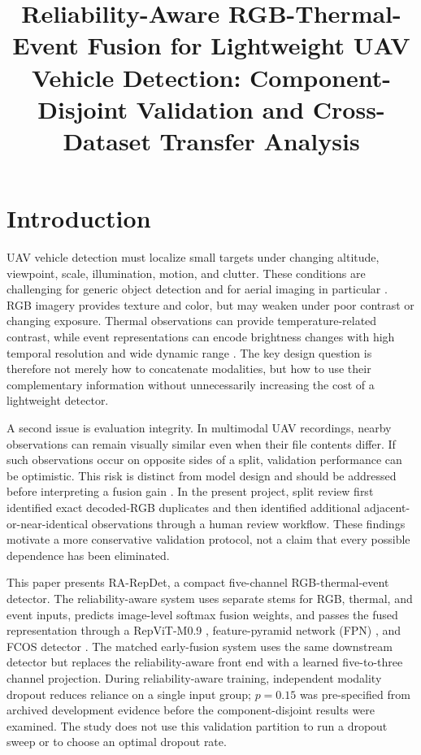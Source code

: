 \documentclass[pdflatex,sn-basic,Numbered,iicol]{sn-jnl}
\title[Reliability-aware RGB-thermal-event fusion]{Reliability-Aware RGB-Thermal-Event Fusion for Lightweight UAV Vehicle Detection: Component-Disjoint Validation and Cross-Dataset Transfer Analysis}
\author[1]{\fnm{Nan} \sur{Xin}}
\author*[1]{\fnm{Xueting} \sur{Jin}}\email{jinxueting@ahpc.edu.cn}
\affil*[1]{\orgname{Anhui Police College}, \orgaddress{\city{Hefei}, \state{Anhui}, \country{China}}}
\begin{document}
\raggedbottom
\maketitle

\section{Introduction}
UAV vehicle detection must localize small targets under changing altitude, viewpoint, scale, illumination, motion, and clutter. These conditions are challenging for generic object detection and for aerial imaging in particular \cite{zhao2019object,cheng2016survey,xia2022dota,zhu2017deepRS}. RGB imagery provides texture and color, but may weaken under poor contrast or changing exposure. Thermal observations can provide temperature-related contrast, while event representations can encode brightness changes with high temporal resolution and wide dynamic range \cite{baltrusaitis2019multimodal,gallego2022event}. The key design question is therefore not merely how to concatenate modalities, but how to use their complementary information without unnecessarily increasing the cost of a lightweight detector.

A second issue is evaluation integrity. In multimodal UAV recordings, nearby observations can remain visually similar even when their file contents differ. If such observations occur on opposite sides of a split, validation performance can be optimistic. This risk is distinct from model design and should be addressed before interpreting a fusion gain \cite{kapoor2023leakage,cawley2010overfitting}. In the present project, split review first identified exact decoded-RGB duplicates and then identified additional adjacent-or-near-identical observations through a human review workflow. These findings motivate a more conservative validation protocol, not a claim that every possible dependence has been eliminated.

This paper presents RA-RepDet, a compact five-channel RGB-thermal-event detector. The reliability-aware system uses separate stems for RGB, thermal, and event inputs, predicts image-level softmax fusion weights, and passes the fused representation through a RepViT-M0.9 \cite{wang2024repvit}, feature-pyramid network (FPN) \cite{lin2017fpn}, and FCOS detector \cite{tian2019fcos}. The matched early-fusion system uses the same downstream detector but replaces the reliability-aware front end with a learned five-to-three channel projection. During reliability-aware training, independent modality dropout reduces reliance on a single input group; $p=0.15$ was pre-specified from archived development evidence before the component-disjoint results were examined. The study does not use this validation partition to run a dropout sweep or to choose an optimal dropout rate.
\end{document}
